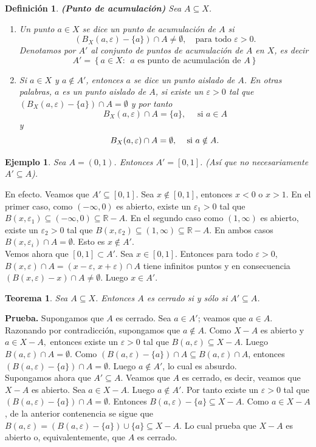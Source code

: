 \documentclass[x11names, 12pt]{book}
\newtheorem{definicion}{Definición}
\newtheorem{teorema}{Teorema}
\newtheorem{example}{Ejemplo}
\begin{document}
\begin{definicion}\textbf{(Punto de acumulación)}
    Sea $A\subseteq X$.
    \begin{enumerate}
        \item Un punto $a\in X$ se dice un punto de acumulación de $A$  si
    $$\left(B_X(a,\varepsilon)-\{a\} \right)\cap A\neq \emptyset , \quad \text{para todo $\varepsilon>0$}.$$
    Denotamos por $A'$ al conjunto de puntos de acumulación de $A$ en $X$, es decir
    $$A'=\left\{ a\in X: \ \  \text{$a$ es punto de acumulación de $A$}\right\}$$
    \item Si $a\in X$ y $a\notin A'$, entonces $a$ se dice un punto aislado de $A$. En otras palabras, $a$ es un punto aislado de $A$, si existe un $\varepsilon>0$ tal que $\left(B_X(a,\varepsilon)-\{a\} \right)\cap A= \emptyset$ y por tanto \[\text{$B_X(a,\varepsilon) \cap A= \{a\}, \quad $ si $a\in A$}\] y \[ \text{$B_X(a,\varepsilon) \cap A= \emptyset$, \quad si  $a\notin A$}.\]
    \end{enumerate}
\end{definicion}

\begin{example}
Sea $A=(0,1)$. Entonces $A'=[0,1]$. (Así que no necesariamente $A'\subseteq A$).
\end{example}
En efecto. Veamos que $A' \subseteq [0,1]$. Sea $x\notin [0,1]$, entonces $x< 0$ o $x > 1$. En el primer caso, como $(-\infty, 0)$ es abierto, existe un $\varepsilon_1>0$ tal que  $ B(x,\varepsilon_1)  \subseteq (-\infty , 0)\subseteq \mathbb{R}-A$. En el segundo caso como $(1,\infty)$ es abierto, existe un $\varepsilon_2>0$ tal que $ B(x,\varepsilon_2) \subseteq (1, \infty )\subseteq \mathbb{R}-A.$ En ambos casos $B(x,\varepsilon_i) \cap A=\emptyset.$ Esto es $x\notin A'$. \\
Vemos ahora que $[0,1] \subset A'.$ Sea $x\in[0,1]$. Entonces para todo $\varepsilon>0$, $B(x,\varepsilon)\cap A=(x-\varepsilon,\, x+\varepsilon)\cap A$ tiene infinitos puntos y en consecuencia $(B(x,\varepsilon)-{x})\cap A \neq \emptyset$. Luego $x\in A'.$
\begin{teorema}
Sea $A\subseteq X$. Entonces $A$ es cerrado si y sólo si $A'\subseteq A$.
\end{teorema}
\textbf{Prueba.} Supongamos que $A$ es cerrado. Sea $a\in A'$; veamos que $a\in A$. Razonando por contradicción, supongamos que $a\notin A$. Como $X-A$ es abierto y $a\in X-A,$ entonces existe un $\varepsilon>0$ tal que $B(a, \varepsilon) \subseteq X-A$. Luego $B(a, \varepsilon) \cap A=\emptyset.$    Como $(B(a, \varepsilon)-\{a\} )\cap A\subseteq B(a, \varepsilon) \cap A$, entonces $(B(a, \varepsilon)-\{a\} )\cap A=\emptyset$. Luego $a\notin A'$, lo cual es absurdo.\\
Supongamos ahora que $A'\subseteq A$. Veamos que $A$ es cerrado, es decir, veamos que $X-A$ es abierto. Sea $a\in X-A$. Luego $a\notin A'$. Por tanto existe un $\varepsilon>0$ tal que  $(B(a, \varepsilon)-\{a\} )\cap A=\emptyset$. Entonces $B(a, \varepsilon)-\{a\} \subseteq X- A.$ Como $a\in X-A$, de la anterior contenencia se sigue que $B(a, \varepsilon)=(B(a, \varepsilon)-\{a\})\cup \{a\} \subseteq X- A.$ Lo cual prueba que $X-A$ es abierto o, equivalentemente, que $A$ es cerrado.
\end{document}
